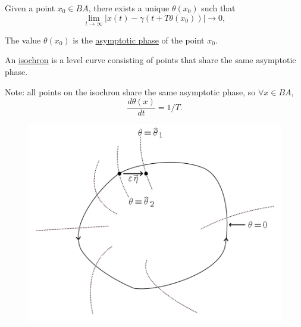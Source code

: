 \documentclass{beamer}
\begin{document}
  \begin{frame}
    \begin{definition}
  Given a point $x_0 \in BA$, there exists a unique $\theta(x_0)$ such that 
  \begin{equation}
    \lim_{t \rightarrow \infty} | x(t) - \gamma(t + T\theta(x_0))  | \rightarrow 0,
  \end{equation}
  
  The value $\theta(x_0)$ is the \underline{asymptotic phase} of the point $x_0$.

  \end{definition}

  \begin{definition}
  An \underline{isochron} is a level curve consisting of points that share the same asymptotic phase.
  
%   
  \end{definition}
   Note: all points on the isochron share the same asymptotic phase, so $\forall x \in BA$,
  \begin{equation}
   \frac{d\theta(x)}{dt} = 1/T.
  \end{equation}
  
  \end{frame}
  
  \begin{frame}
  \begin{figure}
   \includegraphics[width=\textwidth]{isochron-demo.png}
  \end{figure}

   
  \end{frame}
\end{document}
